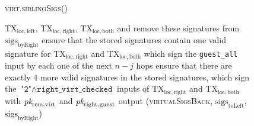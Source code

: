 \begin{figure}[H]
\begin{processbox}{\textsc{virt.siblingSigs}()}
\begin{algorithmic}[1]
      $\mathrm{TX}_{\mathrm{loc}, \mathrm{left}}$, $\mathrm{TX}_{\mathrm{loc},
      \mathrm{right}}$, $\mathrm{TX}_{\mathrm{loc}, \mathrm{both}}$ and remove
      these signatures from $\mathrm{sigs}_{\mathrm{byRight}}$
      \State ensure that the stored signatures contain one valid signature for
      $\mathrm{TX}_{\mathrm{loc}, \mathrm{right}}$ and
      $\mathrm{TX}_{\mathrm{loc}, \mathrm{both}}$ which sign the
      \texttt{guest\_all} input by each one of the next $n-j$ hops
      \State ensure that there are exactly $4$ more valid signatures in the
      stored signatures, which sign the $\texttt{"2"} \wedge
      \texttt{right\_virt\_checked}$ inputs of $\mathrm{TX}_{\mathrm{loc},
      \mathrm{right}}$ and $\mathrm{TX}_{\mathrm{loc}, \mathrm{both}}$ with
      $\textit{pk}_{\mathrm{rem}, \mathrm{virt}}$ and $\textit{pk}_{\mathrm{right},
      \mathrm{guest}}$
      \State output (\textsc{virtualSigsBack},
      $\mathrm{sigs}_{\mathrm{toLeft}}$, $\mathrm{sigs}_{\mathrm{byRight}}$)
    \end{algorithmic}
  \end{processbox}
  \caption{}
  \label{code:virtual-layer:sibling-sigs}
\end{figure}

